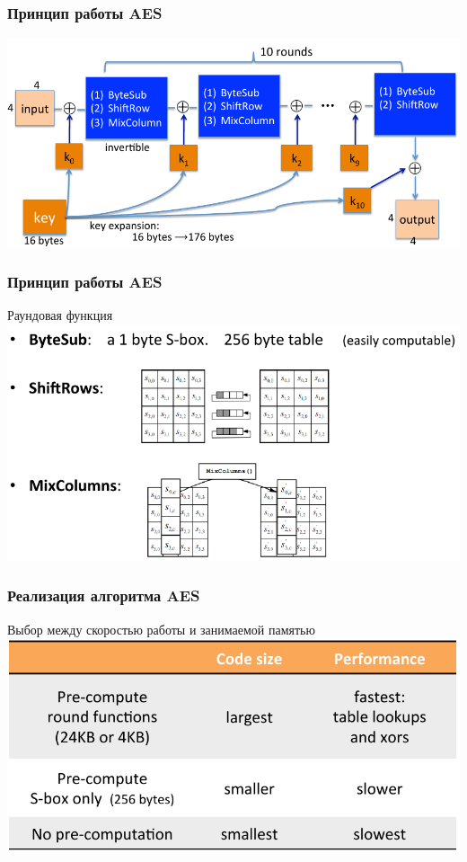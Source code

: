 \documentclass{beamer}
\begin{document}
\begin{frame}
  \frametitle{Принцип работы AES}

  \includegraphics[width=\linewidth]{images/png/AES_rounds}
\end{frame}

\begin{frame}
  \frametitle{Принцип работы AES}

  \begin{block}{Раундовая функция}
    \includegraphics[width=\linewidth]{images/png/AES_round_function}
  \end{block}

\end{frame}


\begin{frame}
  \frametitle{Реализация алгоритма AES}

  \begin{block}{Выбор между скоростью работы и занимаемой памятью}
    \includegraphics[width=\linewidth]{images/png/AES_implementation_tradeoff}
  \end{block}

\end{frame}
\end{document}
